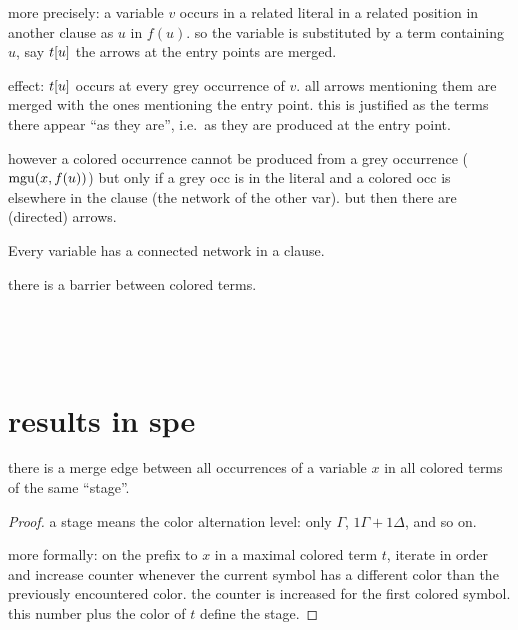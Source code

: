 \documentclass[,%
	paper=a4,%
	DIV11, %
	twoside=false,%
	liststotoc,
	bibtotoc,
	draft=false,%
	numbers=noendperiod
]{scrartcl}
\begin{document}
more precisely: %
a variable $v$ occurs in a related literal in a related position in another clause as $u$ in $f(u)$.
so the variable is substituted by a term containing $u$, say $t[u]$
the arrows at the entry points are merged.

effect: 
$t[u]$ occurs at every grey occurrence of $v$. all arrows mentioning them are merged with the ones mentioning the entry point.
this is justified as the terms there appear ``as they are'', i.e.\ as they are produced at the entry point.

however a colored occurrence cannot be produced from a grey occurrence ($\operatorname{mgu}(x, f(u))$) but only if a grey occ is in the literal and a colored occ is elsewhere in the clause (the network of the other var). but then there are (directed) arrows.


Every variable has a connected network in a clause. 

there is a barrier between colored terms.

~

~

\section{results in spe}

\begin{clemma}
	there is a merge edge between all occurrences of a variable $x$ in all colored terms of the same ``stage''.
\end{clemma}
\begin{proof}
	a stage means the color alternation level: only $\Gamma$, $1 \Gamma + 1 \Delta$, and so on.

	more formally: on the prefix to $x$ in a maximal colored term $t$, iterate in order and increase counter whenever the current symbol has a different color than the previously encountered color. the counter is increased for the first colored symbol. this number plus the color of $t$ define the stage.
\end{proof}
\end{document}
